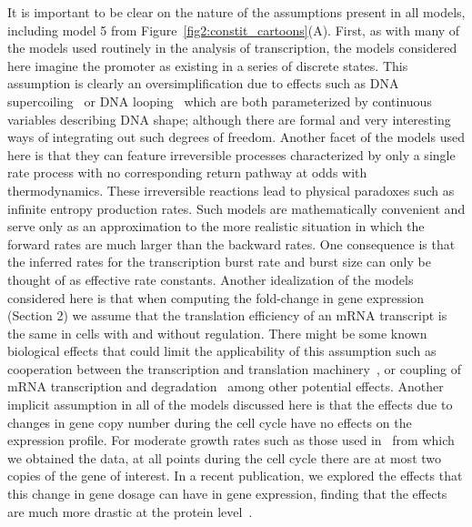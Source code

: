 It is important to be clear on the nature of the assumptions  present in all
models, including model 5 from Figure~\ref{fig2:constit_cartoons}(A). First, as
with many of the models used routinely in the analysis of transcription, the
models considered here imagine the promoter as existing in a series of discrete
states. This assumption is clearly an oversimplification due to effects such as
DNA supercoiling~\cite{Chong2014,Sevier2016} or DNA
looping~\cite{Boedicker2013a} which are both parameterized by  continuous
variables describing DNA shape; although there are formal and very interesting
ways of integrating out such degrees of freedom. Another facet of the models
used here is that they can feature irreversible processes characterized by only
a single rate process with no corresponding return pathway at odds with
thermodynamics. These irreversible reactions lead to physical paradoxes such as
infinite entropy production rates. Such models are mathematically convenient and
serve only as an approximation to the more realistic situation in which the
forward rates are much larger than the backward rates. One consequence is that
the inferred rates for the transcription burst rate and burst size  can only be
thought of as effective rate constants. Another idealization of the models
considered here is that when computing the fold-change in gene expression
(Section 2) we assume that the translation efficiency of an mRNA transcript is
the same in cells with and without regulation. There might be some known
biological effects that could limit the applicability of this assumption such as
cooperation between the transcription and translation
machinery~\cite{Proshkin2010}, or coupling of mRNA transcription and
degradation~\cite{Chen2015} among other potential effects. Another implicit
assumption in all of the models discussed here is that the effects due to
changes in gene copy number during the cell cycle have no effects on the
expression profile. For moderate growth rates such as those used
in~\cite{Jones2014} from which we obtained the data, at all points during the
cell cycle there are at most two copies of the gene of interest. In a recent
publication, we explored the effects that this change in gene dosage can have in
gene expression, finding that the effects are much more drastic at the protein
level~\cite{Razo-Mejia2020}.

